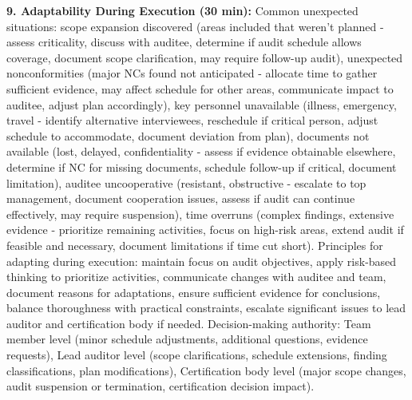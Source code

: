 \documentclass[11pt,a4paper]{article}
\begin{document}
\textbf{9. Adaptability During Execution (30 min):} Common unexpected situations: scope expansion discovered (areas included that weren't planned - assess criticality, discuss with auditee, determine if audit schedule allows coverage, document scope clarification, may require follow-up audit), unexpected nonconformities (major NCs found not anticipated - allocate time to gather sufficient evidence, may affect schedule for other areas, communicate impact to auditee, adjust plan accordingly), key personnel unavailable (illness, emergency, travel - identify alternative interviewees, reschedule if critical person, adjust schedule to accommodate, document deviation from plan), documents not available (lost, delayed, confidentiality - assess if evidence obtainable elsewhere, determine if NC for missing documents, schedule follow-up if critical, document limitation), auditee uncooperative (resistant, obstructive - escalate to top management, document cooperation issues, assess if audit can continue effectively, may require suspension), time overruns (complex findings, extensive evidence - prioritize remaining activities, focus on high-risk areas, extend audit if feasible and necessary, document limitations if time cut short). Principles for adapting during execution: maintain focus on audit objectives, apply risk-based thinking to prioritize activities, communicate changes with auditee and team, document reasons for adaptations, ensure sufficient evidence for conclusions, balance thoroughness with practical constraints, escalate significant issues to lead auditor and certification body if needed. Decision-making authority: Team member level (minor schedule adjustments, additional questions, evidence requests), Lead auditor level (scope clarifications, schedule extensions, finding classifications, plan modifications), Certification body level (major scope changes, audit suspension or termination, certification decision impact).
\end{document}
